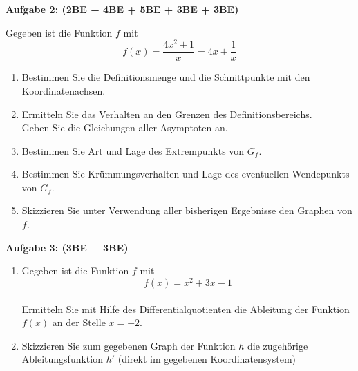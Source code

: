 \documentclass[a4paper,12pt]{article}
\newcommand{\Aufgabe}[1]{
  {
  \vspace*{0.5cm}
  \textsf{\textbf{Aufgabe #1}}
  \vspace*{0.2cm}
  
  }
}
\begin{document}
\Aufgabe{2: (2BE + 4BE + 5BE + 3BE + 3BE)}
Gegeben ist die Funktion $f$ mit
\[ f(x) = \frac{4x^2+1}{x} = 4x + \frac{1}{x} \]
\begin{enumerate}[label={\alph*)}]
  \item Bestimmen Sie die Definitionsmenge und die Schnittpunkte mit den Koordinatenachsen.
  \item Ermitteln Sie das Verhalten an den Grenzen des Definitionsbereichs.\\
    Geben Sie die Gleichungen aller Asymptoten an.
  \item Bestimmen Sie Art und Lage des Extrempunkts von $G_f$.
  \item Bestimmen Sie Krümmungsverhalten und Lage des eventuellen Wendepunkts von $G_f$.
  \item Skizzieren Sie unter Verwendung aller bisherigen Ergebnisse den Graphen von $f$.
\end{enumerate}


\Aufgabe{3: (3BE + 3BE)}

\addtolength{\topmargin}{-6.0pt}
\setlength{\headheight}{18.0pt}

\begin{enumerate}[label={\alph*)}]
  \item Gegeben ist die Funktion $f$ mit 
    \[ f(x) = x^2+3x-1 \]\\
    Ermitteln Sie mit Hilfe des Differentialquotienten die Ableitung der Funktion $f(x)$ an der Stelle $x=-2$.
    \item Skizzieren Sie zum gegebenen Graph der Funktion $h$ die zugehörige Ableitungsfunktion $h'$ (direkt im gegebenen Koordinatensystem)
\end{enumerate}

\begin{center}
\end{center}
\end{document}

